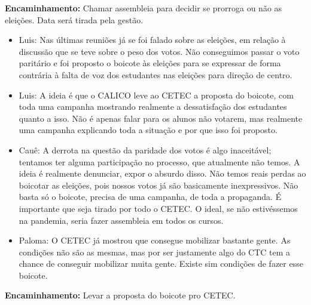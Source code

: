 \documentclass{ata-calico}
\begin{document}
\textbf{Encaminhamento:} Chamar assembleia para decidir se prorroga ou não as eleições. Data será tirada pela gestão.

\begin{itemize}
\item Luis: Nas últimas reuniões já se foi falado sobre as eleições, em relação à discussão que se teve sobre o peso dos votos. Não conseguimos passar o voto paritário e foi proposto o boicote às eleições para se expressar de forma contrária à falta de voz dos estudantes nas eleições para direção de centro.
\item Luis: A ideia é que o CALICO leve ao CETEC a proposta do boicote, com toda uma campanha mostrando realmente a dessatisfação dos estudantes quanto a isso. Não é apenas falar para os alunos não votarem, mas realmente uma campanha explicando toda a situação e por que isso foi proposto.
\item Cauê: A derrota na questão da paridade dos votos é algo inaceitável; tentamos ter alguma participação no processo, que atualmente não temos. A ideia é realmente denunciar, expor o absurdo disso. Não temos reais perdas ao boicotar as eleições, pois nossos votos já são basicamente inexpressivos. Não basta só o boicote, precisa de uma campanha, de toda a propaganda. É importante que seja tirado por todo o CETEC. O ideal, se não estivéssemos na pandemia, seria fazer assembleia em todos os cursos.
\item Paloma: O CETEC já mostrou que consegue mobilizar bastante gente. As condições não são as mesmas, mas por ser justamente algo do CTC tem a chance de conseguir mobilizar muita gente. Existe sim condições de fazer esse boicote.
\end{itemize}

\textbf{Encaminhamento:} Levar a proposta do boicote pro CETEC.
\end{document}
